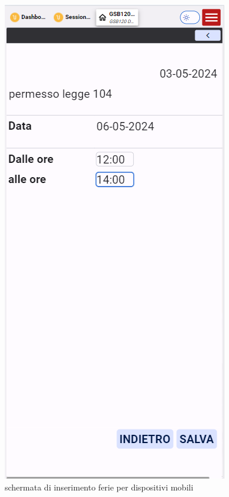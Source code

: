 \documentclass[target=bach,aauheader=,style=]{thud}
\begin{document}
\begin{figure}[H]
\begin{minipage}{0.25\textwidth}
        \caption{schermata di inserimento ferie per dispositivi mobili}
    \end{minipage}
    \hfill
    \begin{minipage}{0.25\textwidth}
        \centering
        \includegraphics[width=\linewidth]{screenshot/Mobile GSA084 Permesso.png}

\end{minipage}
\end{figure}
\end{document}
